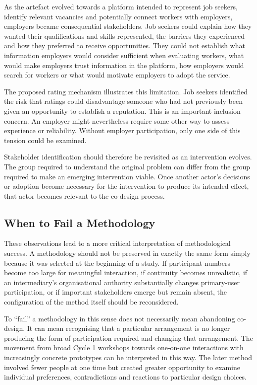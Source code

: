 As the artefact evolved towards a platform intended to represent job seekers, identify relevant vacancies and potentially connect workers with employers, employers became consequential stakeholders. Job seekers could explain how they wanted their qualifications and skills represented, the barriers they experienced and how they preferred to receive opportunities. They could not establish what information employers would consider sufficient when evaluating workers, what would make employers trust information in the platform, how employers would search for workers or what would motivate employers to adopt the service.

The proposed rating mechanism illustrates this limitation. Job seekers identified the risk that ratings could disadvantage someone who had not previously been given an opportunity to establish a reputation. This is an important inclusion concern. An employer might nevertheless require some other way to assess experience or reliability. Without employer participation, only one side of this tension could be examined.

Stakeholder identification should therefore be revisited as an intervention evolves. The group required to understand the original problem can differ from the group required to make an emerging intervention viable. Once another actor's decisions or adoption become necessary for the intervention to produce its intended effect, that actor becomes relevant to the co-design process.


\subsection{When to Fail a Methodology}

These observations lead to a more critical interpretation of methodological success. A methodology should not be preserved in exactly the same form simply because it was selected at the beginning of a study. If participant numbers become too large for meaningful interaction, if continuity becomes unrealistic, if an intermediary's organisational authority substantially changes primary-user participation, or if important stakeholders emerge but remain absent, the configuration of the method itself should be reconsidered.

To ``fail'' a methodology in this sense does not necessarily mean abandoning co-design. It can mean recognising that a particular arrangement is no longer producing the form of participation required and changing that arrangement. The movement from broad Cycle 1 workshops towards one-on-one interactions with increasingly concrete prototypes can be interpreted in this way. The later method involved fewer people at one time but created greater opportunity to examine individual preferences, contradictions and reactions to particular design choices.

